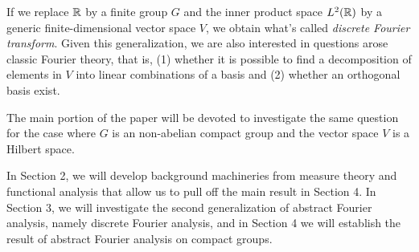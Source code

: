 If we replace $\operatorname{\mathbb{R}}$ by a finite group $G$ and the inner product space $L^2(\operatorname{\mathbb{R}})$
by a generic finite-dimensional vector space $V$, we obtain what's called
\emph{discrete Fourier transform}.  Given this generalization, we are also
interested in questions arose classic Fourier theory, that is, (1) whether it is
possible to find a decomposition of elements in $V$ into linear combinations of
a basis and (2) whether an orthogonal basis exist.

The main portion of the paper will be devoted to investigate the same question
for the case where $G$ is an non-abelian compact group and the vector space $V$
is a Hilbert space.








In Section 2, we will develop background machineries from measure theory and
functional analysis that allow us to pull off the main result in Section 4.  In
Section 3, we will investigate the second generalization of abstract Fourier
analysis, namely discrete Fourier analysis, and in Section 4 we will establish
the result of abstract Fourier analysis on compact groups.



